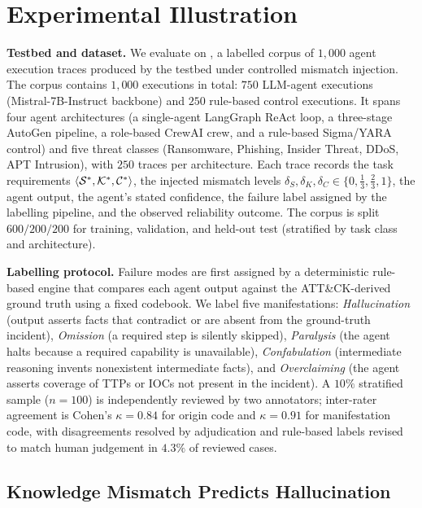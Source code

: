 \section{Experimental Illustration}
\label{sec:experimental}

\textbf{Testbed and dataset.} We evaluate \ARES{} on
\SAFK{}, a labelled corpus of $1{,}000$ agent execution traces produced by
the \ARESBench{} testbed under controlled mismatch injection. The corpus
contains $1{,}000$ executions in total: $750$ LLM-agent executions
(Mistral-7B-Instruct backbone) and $250$ rule-based control executions.
It spans four agent architectures (a single-agent LangGraph ReAct loop, a
three-stage AutoGen pipeline, a role-based CrewAI crew, and a rule-based
Sigma/YARA control) and five threat classes (Ransomware, Phishing, Insider
Threat, DDoS, APT Intrusion), with $250$ traces per architecture. Each trace records the task requirements
$\langle\mathcal{S}^*,\mathcal{K}^*,\mathcal{C}^*\rangle$, the injected mismatch levels
$\delta_S,\delta_K,\delta_C \in \{0,\tfrac{1}{3},\tfrac{2}{3},1\}$, the
agent output, the agent's stated confidence, the failure label assigned by
the labelling pipeline, and the observed reliability outcome.
The corpus is split $600/200/200$ for training, validation, and held-out
test (stratified by task class and architecture).

\textbf{Labelling protocol.} Failure modes are first assigned by a
deterministic rule-based engine that compares each agent output against
the ATT\&CK-derived ground truth using a fixed codebook. We label five
manifestations: \textit{Hallucination} (output asserts facts that
contradict or are absent from the ground-truth incident),
\textit{Omission} (a required step is silently skipped),
\textit{Paralysis} (the agent halts because a required capability is
unavailable), \textit{Confabulation} (intermediate reasoning invents
nonexistent intermediate facts), and \textit{Overclaiming} (the agent
asserts coverage of TTPs or IOCs not present in the incident). A $10\%$
stratified sample ($n = 100$) is independently reviewed by two annotators;
inter-rater agreement is Cohen's $\kappa = 0.84$ for origin code and
$\kappa = 0.91$ for manifestation code, with disagreements resolved by
adjudication and rule-based labels revised to match human judgement in
$4.3\%$ of reviewed cases.

\subsection{Knowledge Mismatch Predicts Hallucination}

